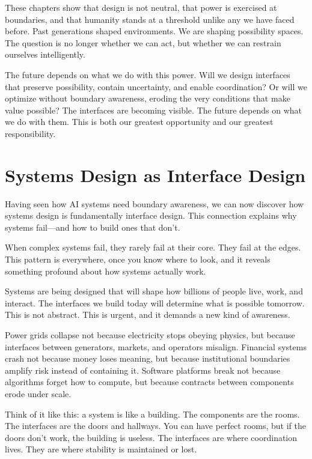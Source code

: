 \documentclass[
  openright]{book}
\begin{document}
These chapters show that design is not neutral, that power is exercised
at boundaries, and that humanity stands at a threshold unlike any we
have faced before. Past generations shaped environments. We are shaping
possibility spaces. The question is no longer whether we can act, but
whether we can restrain ourselves intelligently.

The future depends on what we do with this power. Will we design
interfaces that preserve possibility, contain uncertainty, and enable
coordination? Or will we optimize without boundary awareness, eroding
the very conditions that make value possible? The interfaces are
becoming visible. The future depends on what we do with them. This is
both our greatest opportunity and our greatest responsibility.

\chapter{\texorpdfstring{Systems Design as Interface
Design}{Systems Design as Interface Design}}\label{systems-design-as-interface-design}

Having seen how AI systems need boundary awareness, we can now discover
how systems design is fundamentally interface design. This connection
explains why systems fail---and how to build ones that don't.

When complex systems fail, they rarely fail at their core. They fail at
the edges. This pattern is everywhere, once you know where to look, and
it reveals something profound about how systems actually work.

Systems are being designed that will shape how billions of people live,
work, and interact. The interfaces we build today will determine what is
possible tomorrow. This is not abstract. This is urgent, and it demands
a new kind of awareness.

Power grids collapse not because electricity stops obeying physics, but
because interfaces between generators, markets, and operators misalign.
Financial systems crash not because money loses meaning, but because
institutional boundaries amplify risk instead of containing it. Software
platforms break not because algorithms forget how to compute, but
because contracts between components erode under scale.

Think of it like this: a system is like a building. The components are
the rooms. The interfaces are the doors and hallways. You can have
perfect rooms, but if the doors don't work, the building is useless. The
interfaces are where coordination lives. They are where stability is
maintained or lost.
\end{document}
